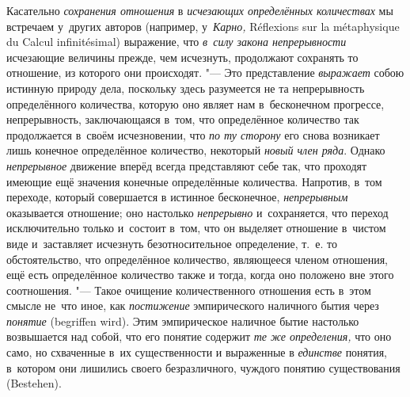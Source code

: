 Касательно {\em сохранения отношения} в
{\em исчезающих определённых количествах} мы
встречаем у~других авторов (например, у~{\em Карно,}
Ré\-flexi\-ons sur la méta\-phy\-sique du Cal\-cul in\-fini\-tési\-mal)
выражение, что {\em в~силу закона непрерывности} исчезающие величины прежде,
чем исчезнуть, продолжают сохранять то отношение, из которого они происходят.
"--- Это представление {\em выражает} собою истинную природу дела, поскольку
здесь разумеется не та непрерывность определённого количества, которую оно
являет нам в~бесконечном прогрессе, непрерывность, заключающаяся в~том, что
определённое количество так продолжается в~своём исчезновении, что
{\em по ту сторону} его снова возникает лишь конечное определённое
количество, некоторый {\em новый член ряда}. Однако {\em непрерывное} движение
вперёд всегда представляют себе так, что проходят имеющие ещё значения
конечные определённые количества. Напротив, в~том переходе, который совершается
в истинное бесконечное, {\em непрерывным} оказывается отношение; оно настолько
{\em непрерывно} и~сохраняется, что переход исключительно только и~состоит
в~том, что он выделяет отношение в~чистом виде и~заставляет исчезнуть
безотносительное определение, т.~е. то обстоятельство, что определённое
количество, являющееся членом отношения, ещё есть определённое количество также
и тогда, когда оно положено вне этого соотношения. "--- Такое очищение
количественного отношения есть в~этом смысле не~что иное, как
{\em постижение} эмпирического наличного бытия через
{\em понятие} (be\-grif\-fen wird). Этим эмпирическое наличное бытие
настолько возвышается над собой, что его понятие содержит
{\em те же определения,} что оно само, но схваченные в~их существенности и
выраженные в {\em единстве} понятия, в~котором они лишились своего безразличного,
чуждого понятию существования (Bestehen).

